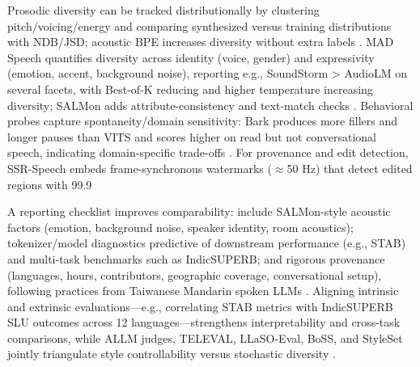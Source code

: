 \documentclass{article}
\begin{document}
Prosodic diversity can be tracked distributionally by clustering pitch/voicing/energy and comparing synthesized versus training distributions with NDB/JSD; acoustic BPE increases diversity without extra labels \cite{li2024effectivenessacousticbpedecoderonlytts}. MAD Speech quantifies diversity across identity (voice, gender) and expressivity (emotion, accent, background noise), reporting e.g., SoundStorm > AudioLM on several facets, with Best-of-K reducing and higher temperature increasing diversity; SALMon adds attribute-consistency and text-match checks \cite{futeral2025madspeechmeasuresacousticdiversity,maimon2025salmonsuiteacousticlanguagemodelevaluati}. Behavioral probes capture spontaneity/domain sensitivity: Bark produces more fillers and longer pauses than VITS and scores higher on read but not conversational speech, indicating domain-specific trade-offs \cite{wang2024evaluatingtextspeechsynthesislargediscre}. For provenance and edit detection, SSR-Speech embeds frame-synchronous watermarks ($\approx$50 Hz) that detect edited regions with 99.9%

A reporting checklist improves comparability: include SALMon-style acoustic factors (emotion, background noise, speaker identity, room acoustics); tokenizer/model diagnostics predictive of downstream performance (e.g., STAB) and multi-task benchmarks such as IndicSUPERB; and rigorous provenance (languages, hours, contributors, geographic coverage, conversational setup), following practices from Taiwanese Mandarin spoken LLMs \cite{maimon2025salmonsuiteacousticlanguagemodelevaluati,vashishth2024stabspeechtokenizerassessmentbenchmark,entry2025indicsuperbspeechprocessinguniversalperf,yang2024buildingtaiwanesemandarinspokenlanguagem}. Aligning intrinsic and extrinsic evaluations---e.g., correlating STAB metrics with IndicSUPERB SLU outcomes across 12 languages---strengthens interpretability and cross-task comparisons, while ALLM judges, TELEVAL, LLaSO-Eval, BoSS, and StyleSet jointly triangulate style controllability versus stochastic diversity \cite{vashishth2024stabspeechtokenizerassessmentbenchmark,entry2025indicsuperbspeechprocessinguniversalperf,chiang2025audioawarelargelanguagemodelsasjudgesspe,li2025televaldynamicbenchmarkdesignedspokenlan,sun2025llasofoundationalframeworkreproduciblere,wang2025bossbeyondsemanticspeech}.
\end{document}
